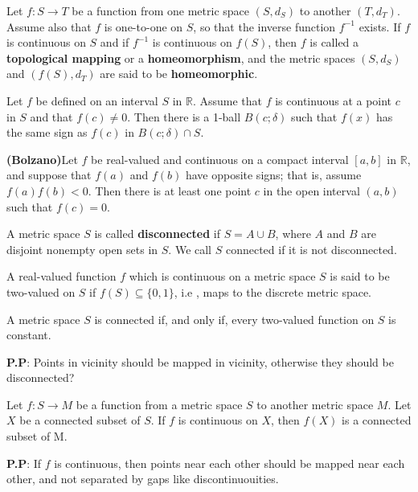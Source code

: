 \documentclass[10pt,a4paper]{book}
\begin{document}
\begin{deff}
 Let $f : S \rightarrow T$ be a function from one metric space $(S, d_S)$ to another $(T, d_T)$. Assume also that $f$ is one-to-one on $S$, so that the inverse function $f^{-1}$ exists. If $f$ is continuous on $S$ and if $f^{-1}$ is continuous on $f(S)$, then $f$ is called a \textbf{topological mapping} or a \textbf{homeomorphism}, and the metric spaces $(S, d_S)$ and $(f(S), d_T)$ are said to be \textbf{homeomorphic}.
\end{deff}

\begin{Thm}
Let $f$ be defined on an interval $S$ in $\mathbb{R}$. Assume that $f$ is continuous at a point $c$ in $S$ and that $f(c)  \neq 0$. Then there is a 1-ball $B(c; \delta)$ such that $f(x)$ has the same sign as $f(c)$ in $B(c; \delta) \cap S$.

\end{Thm}

\begin{Thm}
\textbf{(Bolzano)}Let $f$ be real-valued and continuous on a compact interval $[a, b]$ in $\mathbb{R}$, and suppose that $f(a)$ and $f(b)$ have opposite signs; that is, assume $f(a)f(b) < 0$. Then there is at least one point $c$ in the open interval $(a, b)$ such that $f(c) = 0$.

\end{Thm}

\begin{Thm}
 A metric space $S$ is called \textbf{disconnected} if $S = A \cup B$, where $A$ and $B$ are disjoint nonempty open sets in $S$. We call $S$ connected if it is not disconnected.

\end{Thm}

\begin{deff}
A real-valued function $f$ which is continuous on a metric space $S$ is said to be two-valued on $S$ if $f(S) \subseteq \{0, 1\}$, i.e , maps to the discrete metric space.

\end{deff}

\begin{Thm}
 A metric space $S$ is connected if, and only if, every two-valued function on $S$ is constant.
\end{Thm}
\noindent \textbf{P.P}: Points in vicinity should be mapped in vicinity, otherwise they should be disconnected?

\begin{Thm}
 Let $f : S \rightarrow M$ be a function from a metric space $S$ to another metric space $M$. Let $X$ be a connected subset of $S$. If $f$ is continuous on $X$, then $f(X)$ is a connected subset of M.

\end{Thm}
\noindent \textbf{P.P}: If $f$ is continuous, then points near each other should be mapped near each other, and not separated by gaps like discontinuouities.
\end{document}
